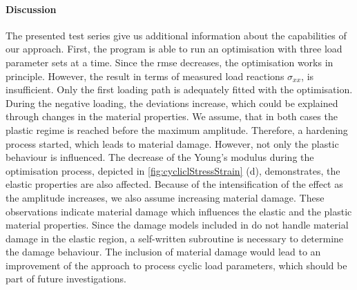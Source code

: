 \paragraph{Discussion}
The presented test series give us additional information about the capabilities of our approach. First, the program is able to run an optimisation with three load parameter sets at a time. Since the \acrshort{rmse} decreases, the optimisation works in principle.
However, the result in terms of measured load reactions $\sigma_{xx}$, is insufficient.
Only the first loading path is adequately fitted with the optimisation.
During the negative loading, the deviations increase, which could be explained through changes in the material properties.
We assume, that in both cases the plastic regime is reached before the maximum amplitude. Therefore, a hardening process started, which leads to material damage. However, not only the plastic behaviour is influenced.
The decrease of the Young's modulus during the optimisation process, depicted in \autoref{fig:cycliclStressStrain} (d), demonstrates, the elastic properties are also affected.
Because of the intensification of the effect as the amplitude increases, we also assume increasing material damage.
These observations indicate material damage which influences the elastic and the plastic material properties. Since the damage models included in  do not handle material damage in the elastic region, a self-written subroutine is necessary to determine the damage behaviour. The inclusion of material damage would lead to an improvement of the approach to process cyclic load parameters, which should be part of future investigations. 










